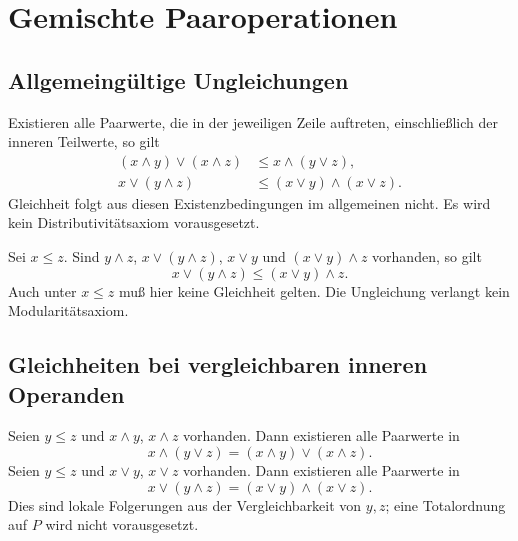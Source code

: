 \chapter{Gemischte Paaroperationen}
\label{b14guide:ch:mixed}

\section{Allgemeingültige Ungleichungen}

\begin{theorem}
\label{b14guide:thm:distributive-inequalities}
Existieren alle Paarwerte, die in der jeweiligen Zeile auftreten,
einschließlich der inneren Teilwerte, so gilt
\[
\begin{aligned}
 (x\wedge y)\vee(x\wedge z)&\leq x\wedge(y\vee z),\\
 x\vee(y\wedge z)&\leq(x\vee y)\wedge(x\vee z).
\end{aligned}
\]
Gleichheit folgt aus diesen Existenzbedingungen im allgemeinen
nicht. Es wird kein Distributivitätsaxiom vorausgesetzt.
\end{theorem}

\begin{theorem}
\label{b14guide:thm:modular-inequality}
Sei $x\leq z$. Sind $y\wedge z$, $x\vee(y\wedge z)$,
$x\vee y$ und $(x\vee y)\wedge z$ vorhanden, so gilt
\[
 x\vee(y\wedge z)\leq(x\vee y)\wedge z.
\]
Auch unter $x\leq z$ muß hier keine Gleichheit gelten.
Die Ungleichung verlangt kein Modularitätsaxiom.
\end{theorem}

\section{Gleichheiten bei vergleichbaren inneren Operanden}

\begin{theorem}
\label{b14guide:thm:comparable-distribution}
Seien $y\leq z$ und $x\wedge y$, $x\wedge z$ vorhanden.
Dann existieren alle Paarwerte in
\[
 x\wedge(y\vee z)=(x\wedge y)\vee(x\wedge z).
\]
Seien $y\leq z$ und $x\vee y$, $x\vee z$ vorhanden.
Dann existieren alle Paarwerte in
\[
 x\vee(y\wedge z)=(x\vee y)\wedge(x\vee z).
\]
Dies sind lokale Folgerungen aus der Vergleichbarkeit
von $y,z$; eine Totalordnung auf $P$ wird nicht vorausgesetzt.
\end{theorem}